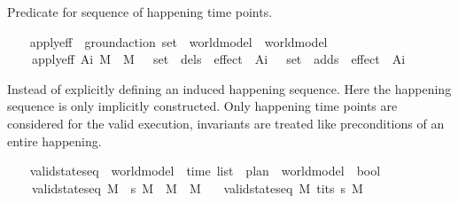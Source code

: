 \begin{isabellebody}
\begin{isamarkuptext}
Predicate for sequence of happening time points.%
\end{isamarkuptext}\isamarkuptrue%
\ \ \isamarkupfalse%
\ apply{\isacharunderscore}{\kern0pt}eff\ {\isacharcolon}{\kern0pt}{\isacharcolon}{\kern0pt}\ {\isachardoublequoteopen}ground{\isacharunderscore}{\kern0pt}action\ set\ {\isasymRightarrow}\ world{\isacharunderscore}{\kern0pt}model\ {\isasymRightarrow}\ world{\isacharunderscore}{\kern0pt}model{\isachardoublequoteclose}\ \isanewline
\ \ \ \ {\isachardoublequoteopen}apply{\isacharunderscore}{\kern0pt}eff\ A\isactrlsub i\ M\ {\isacharequal}{\kern0pt}\ {\isacharparenleft}{\kern0pt}M\ {\isacharminus}{\kern0pt}\ {\isasymUnion}\ {\isacharparenleft}{\kern0pt}set\ {\isacharbackquote}{\kern0pt}\ dels\ {\isacharbackquote}{\kern0pt}\ effect\ {\isacharbackquote}{\kern0pt}\ A\isactrlsub i{\isacharparenright}{\kern0pt}{\isacharparenright}{\kern0pt}\ {\isasymunion}\ {\isasymUnion}\ {\isacharparenleft}{\kern0pt}set\ {\isacharbackquote}{\kern0pt}\ adds\ {\isacharbackquote}{\kern0pt}\ effect\ {\isacharbackquote}{\kern0pt}\ A\isactrlsub i{\isacharparenright}{\kern0pt}{\isachardoublequoteclose}%
\begin{isamarkuptext}%
Instead of explicitly defining an induced happening sequence. Here the 
  happening sequence is only implicitly constructed. Only happening time points are considered 
  for the valid execution, invariants are treated like preconditions of an entire happening.%
\end{isamarkuptext}\isamarkuptrue%
\ \ \isamarkupfalse%
\ valid{\isacharunderscore}{\kern0pt}state{\isacharunderscore}{\kern0pt}seq\ {\isacharcolon}{\kern0pt}{\isacharcolon}{\kern0pt}\ {\isachardoublequoteopen}world{\isacharunderscore}{\kern0pt}model\ {\isasymRightarrow}\ time\ list\ {\isasymRightarrow}\ plan\ {\isasymRightarrow}\ world{\isacharunderscore}{\kern0pt}model\ {\isasymRightarrow}\ bool{\isachardoublequoteclose}\ \isanewline
\ \ \ \ {\isachardoublequoteopen}valid{\isacharunderscore}{\kern0pt}state{\isacharunderscore}{\kern0pt}seq\ M\ {\isacharbrackleft}{\kern0pt}{\isacharbrackright}{\kern0pt}\ {\isasympi}s\ M{\isacharprime}{\kern0pt}\ {\isasymlongleftrightarrow}\ {\isacharparenleft}{\kern0pt}M\ {\isacharequal}{\kern0pt}\ M{\isacharprime}{\kern0pt}{\isacharparenright}{\kern0pt}{\isachardoublequoteclose}\isanewline
\ \ {\isacharbar}{\kern0pt}\ {\isachardoublequoteopen}valid{\isacharunderscore}{\kern0pt}state{\isacharunderscore}{\kern0pt}seq\ M\ {\isacharparenleft}{\kern0pt}t\isactrlsub i{\isacharhash}{\kern0pt}ts{\isacharparenright}{\kern0pt}\ {\isasympi}s\ M{\isacharprime}{\kern0pt}\ {\isasymlongleftrightarrow}\ \isanewline

\end{isabellebody}
